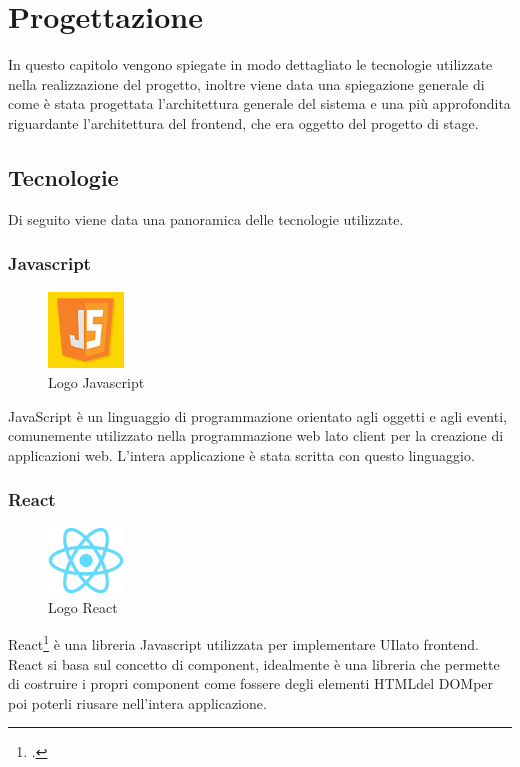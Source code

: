 
\chapter{Progettazione}
\label{cap:progettazione}

In questo capitolo vengono spiegate in modo dettagliato le tecnologie utilizzate nella realizzazione del progetto, inoltre viene data una spiegazione generale di come è
stata progettata l'architettura generale del sistema e una più approfondita riguardante l'architettura del frontend, che era oggetto del progetto di stage.

\section{Tecnologie}

Di seguito viene data una panoramica delle tecnologie utilizzate.

\subsection*{Javascript}
\begin{figure}[H]
  \centering
  \includegraphics[width=2cm]{immagini/logo-js.png}
  \caption{Logo Javascript}
\end{figure}
JavaScript è un linguaggio di programmazione orientato agli oggetti e agli eventi, comunemente utilizzato nella programmazione web lato client per la creazione di applicazioni web.
L'intera applicazione è stata scritta con questo linguaggio.

\subsection*{React}
\begin{figure}[H]
  \centering
  \includegraphics[width=2cm]{immagini/logo-react.png}
  \caption{Logo React}
\end{figure}
React\footcite{site:react} è una libreria Javascript utilizzata per implementare \gls{UI}\glsfirstoccur lato frontend. React si basa sul concetto di component,
idealmente è una libreria che permette di costruire i propri component come fossere degli elementi \gls{HTML}\glsfirstoccur del \gls{DOM}\glsfirstoccur per poi poterli riusare nell'intera applicazione.

